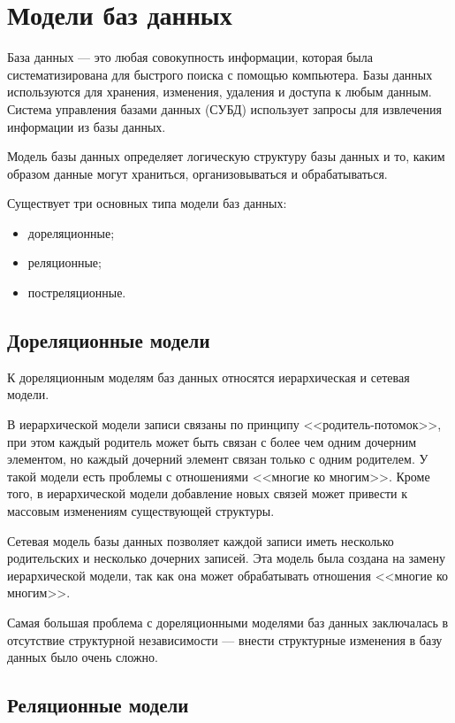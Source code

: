 \documentclass[a4paper,14pt, unknownkeysallowed]{extreport}
\begin{document}
\section{Модели баз данных}

База данных --- это любая совокупность информации, которая была систематизирована для быстрого поиска с помощью компьютера. Базы данных используются для хранения, изменения, удаления и доступа к любым данным. Система управления базами данных (СУБД) использует запросы для извлечения информации из базы данных.

Модель базы данных определяет логическую структуру базы данных и то, каким образом данные могут храниться, организовываться и обрабатываться.

Существует три основных типа модели баз данных:

\begin{itemize}
    \item дореляционные;
    \item реляционные;
    \item постреляционные.
\end{itemize}

\subsection{Дореляционные модели}

К дореляционным моделям баз данных относятся иерархическая и сетевая модели. 

В иерархической модели записи связаны по принципу <<родитель-потомок>>, при этом каждый родитель может быть связан с более чем одним дочерним элементом, но каждый дочерний элемент связан только с одним родителем. У такой модели есть проблемы с отношениями <<многие ко многим>>. Кроме того, в иерархической модели добавление новых связей может привести к массовым изменениям существующей структуры.

Сетевая модель базы данных позволяет каждой записи иметь несколько родительских и несколько дочерних записей. Эта модель была создана на замену иерархической модели, так как она может обрабатывать отношения <<многие ко многим>>.

Самая большая проблема с дореляционными моделями баз данных заключалась в отсутствие структурной независимости --- внести структурные изменения в базу данных было очень сложно.

\subsection{Реляционные модели}
\end{document}

